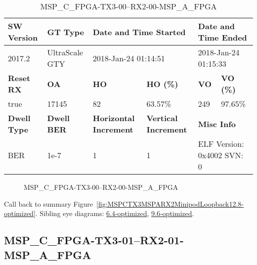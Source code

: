 \begin{table}[h]
\centering
\caption{MSP\_C\_FPGA-TX3-00--RX2-00-MSP\_A\_FPGA}
\label{tab:MSPCFPGATX300RX200MSPAFPGA12.8-optimized}
\begin{tabular}{@{}|l|l|l|l|l|l|@{}}
\toprule
\textbf{SW Version}                & \textbf{GT Type}   & \multicolumn{2}{l|}{\textbf{Date and Time Started}}            & \multicolumn{2}{l|}{\textbf{Date and Time Ended}}        \\ \midrule
2017.2                       & UltraScale GTY          & \multicolumn{2}{l|}{2018-Jan-24 01:14:51}                   & \multicolumn{2}{l|}{2018-Jan-24 01:15:33}               \\ \midrule
\textbf{Reset RX}                  & \textbf{OA} & \textbf{HO}   & \textbf{HO (\%)} & \textbf{VO} & \textbf{VO (\%)} \\ \midrule
true & 17145        & 82          & 63.57\%        & 249        & 97.65\%       \\ \midrule
\textbf{Dwell Type}                & \textbf{Dwell BER} & \textbf{Horizontal Increment} & \textbf{Vertical Increment}    & \multicolumn{2}{l|}{\textbf{Misc Info}}                  \\ \midrule
BER                            & 1e-7        & 1        & 1           & \multicolumn{2}{l|}{ELF Version: 0x4002 SVN: 0}                         \\ \bottomrule
\end{tabular}
\end{table}

\begin{figure}[h]
\caption{MSP\_C\_FPGA-TX3-00--RX2-00-MSP\_A\_FPGA} \label{fig:MSPCFPGATX300RX200MSPAFPGA12.8-optimized}
\end{figure}

Call back to summary Figure~\ref{fig:MSPCTX3MSPARX2MinipodLoopback12.8-optimized}.
Sibling eye diagrams: \hyperref[sec:MSPCFPGATX300RX200MSPAFPGA6.4-optimized]{6.4-optimized}, \hyperref[sec:MSPCFPGATX300RX200MSPAFPGA9.6-optimized]{9.6-optimized}.

\clearpage
\newpage


\subsection{MSP\_C\_FPGA-TX3-01--RX2-01-MSP\_A\_FPGA}\label{sec:MSPCFPGATX301RX201MSPAFPGA12.8-optimized}

